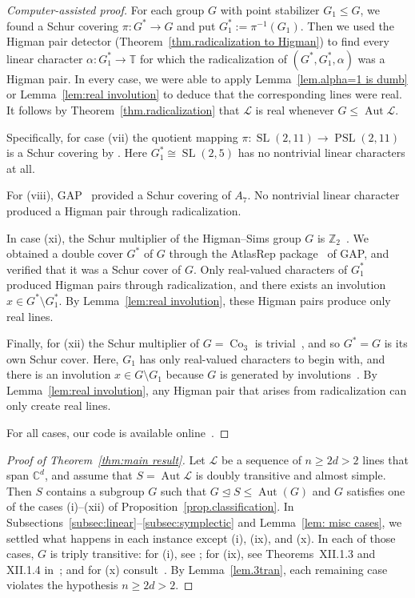 \documentclass[11pt]{article}
\theoremstyle{definition}
\numberwithin{equation}{section}
\begin{document}
\begin{proof}[Computer-assisted proof]
For each group $G$ with point stabilizer $G_1 \leq G$, we found a Schur covering $\pi \colon G^* \to G$ and put $G_1^* := \pi^{-1}(G_1)$.
Then we used the Higman pair detector (Theorem~\ref{thm.radicalization to Higman}) to find every linear character $\alpha \colon G_1^* \to \mathbb{T}$ for which the radicalization of $(G^*,G_1^*,\alpha)$ was a Higman pair.
In every case, we were able to apply Lemma~\ref{lem.alpha=1 is dumb} or Lemma~\ref{lem:real involution} to deduce that the corresponding lines were real.
It follows by Theorem~\ref{thm.radicalization} that $\mathscr{L}$ is real whenever $G \leq \operatorname{Aut} \mathscr{L}$.

Specifically, for case (vii) the quotient mapping $\pi \colon \operatorname{SL}(2,11) \to \operatorname{PSL}(2,11)$ is a Schur covering by \cite[Theorem~7.1.1]{Karpilovsky:87}.
Here $G_1^* \cong \operatorname{SL}(2,5)$ has no nontrivial linear characters at all.

For (viii), GAP~\cite{GAP} provided a Schur covering of $A_7$.
No nontrivial linear character produced a Higman pair through radicalization.

In case (xi), the Schur multiplier of the Higman--Sims group $G$ is $\mathbb{Z}_2$~\cite{McKayWales:71}.
We obtained a double cover $G^*$ of $G$ through the AtlasRep package~\cite{AtlasRep} of GAP, and verified that it was a Schur cover of $G$.
Only real-valued characters of $G_1^*$ produced Higman pairs through radicalization, and there exists an involution $x \in G^* \setminus G_1^*$.
By Lemma~\ref{lem:real involution}, these Higman pairs produce only real lines.

Finally, for (xii) the Schur multiplier of $G=\operatorname{Co}_3$ is trivial~\cite{Griess:74}, and so $G^* = G$ is its own Schur cover.
Here, $G_1$ has only real-valued characters to begin with, and there is an involution $x \in G \setminus G_1$ because $G$ is generated by involutions~\cite{MSW:94}.
By Lemma~\ref{lem:real involution}, any Higman pair that arises from radicalization can only create real lines.

For all cases, our code is available online~\cite{github}.
\end{proof}


\begin{proof}[Proof of Theorem~\ref{thm:main result}]
Let $\mathscr{L}$ be a sequence of $n \geq 2d > 2$ lines that span $\mathbb{C}^d$, and assume that $S = \operatorname{Aut} \mathscr{L}$ is doubly transitive and almost simple.
Then $S$ contains a subgroup $G$ such that $G\unlhd S\leq\operatorname{Aut}(G)$ and $G$ satisfies one of the cases (i)--(xii) of Proposition~\ref{prop.classification}.
In Subsections~\ref{subsec:linear}--\ref{subsec:symplectic} and Lemma~\ref{lem: misc cases}, we settled what happens in each instance except (i), (ix), and (x).
In each of those cases, $G$ is triply transitive: for (i), see \cite[Theorem~9.7]{Wielandt:64}; for (ix), see Theorems~XII.1.3 and XII.1.4 in~\cite{HuppertB:82:III}; and for (x) consult~\cite[Theorem~XII.1.9]{HuppertB:82:III}.
By Lemma~\ref{lem.3tran}, each remaining case violates the hypothesis $n \geq 2d > 2$.
\end{proof}
\end{document}
